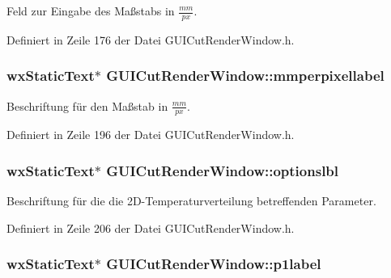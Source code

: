 Feld zur Eingabe des Maßstabs in $\frac{mm}{px}$. 



Definiert in Zeile 176 der Datei G\-U\-I\-Cut\-Render\-Window.\-h.

\hypertarget{classGUICutRenderWindow_ab1f4863c699e72e54e8b3f6d320a5e3a}{
\subsubsection[{mmperpixellabel}]{\setlength{\rightskip}{0pt plus 5cm}wx\-Static\-Text$\ast$ G\-U\-I\-Cut\-Render\-Window\-::mmperpixellabel\hspace{0.3cm}{\ttfamily [private]}}}\label{classGUICutRenderWindow_ab1f4863c699e72e54e8b3f6d320a5e3a}


Beschriftung für den Maßstab in $\frac{mm}{px}$. 



Definiert in Zeile 196 der Datei G\-U\-I\-Cut\-Render\-Window.\-h.

\hypertarget{classGUICutRenderWindow_a3317d0e8526d4a11168e86f673576ee3}{
\subsubsection[{optionslbl}]{\setlength{\rightskip}{0pt plus 5cm}wx\-Static\-Text$\ast$ G\-U\-I\-Cut\-Render\-Window\-::optionslbl\hspace{0.3cm}{\ttfamily [private]}}}\label{classGUICutRenderWindow_a3317d0e8526d4a11168e86f673576ee3}


Beschriftung für die die 2\-D-\/\-Temperaturverteilung betreffenden Parameter. 



Definiert in Zeile 206 der Datei G\-U\-I\-Cut\-Render\-Window.\-h.

\hypertarget{classGUICutRenderWindow_ac28961397f75c1d67dd1d983cda586f8}{
\subsubsection[{p1label}]{\setlength{\rightskip}{0pt plus 5cm}wx\-Static\-Text$\ast$ G\-U\-I\-Cut\-Render\-Window\-::p1label\hspace{0.3cm}{\ttfamily [private]}}}\label{classGUICutRenderWindow_ac28961397f75c1d67dd1d983cda586f8}


